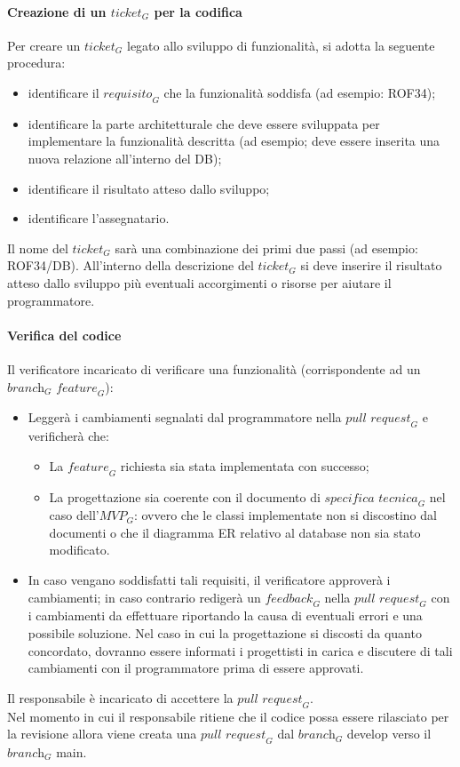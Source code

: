 \paragraph{Creazione di un $\textit{ticket}_G$ per la codifica}
Per creare un $\textit{ticket}_G$ legato allo sviluppo di funzionalità, si adotta la seguente procedura:
\begin{itemize}
    \item identificare il $\textit{requisito}_G$  che la funzionalità soddisfa (ad esempio: ROF34);
    \item identificare la parte architetturale che deve essere sviluppata per implementare la funzionalità descritta (ad esempio; deve essere inserita una nuova relazione all'interno del DB);
    \item identificare il risultato atteso dallo sviluppo;
    \item identificare l'assegnatario.
\end{itemize}
Il nome del $\textit{ticket}_G$ sarà una combinazione dei primi due passi (ad esempio: ROF34/DB). All'interno della descrizione del $\textit{ticket}_G$ si deve inserire il risultato atteso dallo sviluppo più eventuali accorgimenti o risorse per aiutare il programmatore.

\paragraph{Verifica del codice}
Il verificatore incaricato di verificare una funzionalità (corrispondente ad un $\textit{branch}_G$ $\textit{feature}_G$):
\begin{itemize}
    \item Leggerà i cambiamenti segnalati dal programmatore nella $\textit{pull request}_G$ e verificherà che:
    \begin{itemize}
        \item La $\textit{feature}_G$ richiesta sia stata implementata con successo;
        \item La progettazione sia coerente con il documento di $\textit{specifica tecnica}_G$ nel caso dell'$\textit{MVP}_G$: ovvero che le classi implementate non si discostino dal documenti o che il diagramma ER relativo al database non sia stato modificato.
    \end{itemize}
    \item In caso vengano soddisfatti tali requisiti, il verificatore approverà i cambiamenti; in caso contrario redigerà un $\textit{feedback}_G$ nella $\textit{pull request}_G$ con i cambiamenti da effettuare riportando la causa di eventuali errori e una possibile soluzione. Nel caso in cui la progettazione si discosti da quanto concordato, dovranno essere informati i progettisti in carica e discutere di tali cambiamenti con il programmatore prima di essere approvati.
\end{itemize}
Il responsabile è incaricato di accettere la $\textit{pull request}_G$. \\
Nel momento in cui il responsabile ritiene che il codice possa essere rilasciato per la revisione allora viene creata una $\textit{pull request}_G$ dal $\textit{branch}_G$ develop verso il $\textit{branch}_G$ main.

